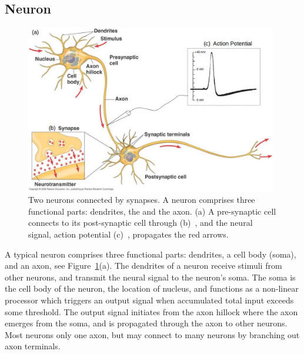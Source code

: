 \subsection{Neuron}
	\begin{figure}[bt]
	\centering
	\includegraphics[width=0.98\textwidth]{pics_snn/neuron2.png}
	\caption{Two neurons connected by synapses. 
		A neuron comprises three functional parts: dendrites, the \protect{} \protect{} and the axon. (a) A pre-synaptic cell connects to its post-synaptic cell through \protect{} \protect{} (b)~\citep{reece2011campbell}, and the neural signal, \protect{} action potential \protect{} (c)~\citep{hodgkin1939action}, propagates \protect{} \protect{} the red arrows. }
	\label{Fig:neuron_basic}
\end{figure}

A typical neuron comprises \protect{} three functional parts: dendrites, a cell body (soma), and an axon, see Figure~\ref{Fig:neuron_basic}(a).
The dendrites of a neuron receive stimuli from other neurons, and transmit the neural signal to the neuron's soma.
The soma is the cell body of the neuron, the location of \protect{} nucleus, and functions as a non-linear processor which triggers an output signal when \protect{} accumulated total input exceeds some threshold.
The output signal initiates from the axon hillock where the axon emerges from the soma, and is propagated through the axon to other neurons.
Most neurons \protect{} \protect{} only one axon, but may connect to many neurons by branching out axon terminals. 


